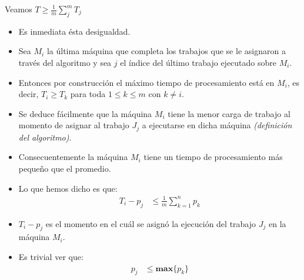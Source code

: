 \begin{frame}{\subsectiontitle}
    Veamos \(T \geq \frac{1}{m} \sum_{j}^{m} T_{j}\)
    \begin{itemize}
        \item Es inmediata ésta desigualdad.
    \end{itemize}
\end{frame}
\begin{frame}{\subsectiontitle}
    \begin{itemize}
        \item Sea \(M_{i}\) la última máquina que completa los trabajos que se le asignaron a través del algoritmo y sea \(j\) el índice del último trabajo 
        ejecutado sobre \(M_{i}\). 
        \item Entonces por construcción el máximo tiempo de procesamiento está en \(M_{i}\), es decir, \(T_{i} \geq T_{k}\) para toda \(1 \leq k \leq m\) con \(k \neq i\). 
    \end{itemize}
\end{frame}
\begin{frame}{\subsectiontitle}
    \begin{itemize}
        \item Se deduce fácilmente que la máquina \(M_{i}\) tiene la menor carga de trabajo al momento de asignar al trabajo \(J_{j}\) a ejecutarse en dicha máquina \textit{(definición del algoritmo)}. 
        \item Consecuentemente la máquina \(M_i\) tiene un tiempo de procesamiento más pequeño que el promedio.
    \end{itemize}
\end{frame}
\begin{frame}{\subsectiontitle}
    \begin{itemize}
        \item Lo que hemos dicho es que:
            \begin{align*}
                T_{i} - p_{j} &\leq \frac{1}{m}\sum_{k=1}^{n}p_{k}
            \end{align*}
        \item \(T_{i} - p_{j}\) es el momento en el cuál se asignó la ejecución del trabajo \(J_{j}\) en la máquina \(M_{i}\).
        \item Es trivial ver que:
        \begin{align*}
            p_{j} &\leq \mathbf{max}\{p_{k}\}
        \end{align*}
    \end{itemize}
\end{frame}


